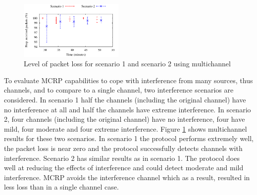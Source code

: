 \begin{figure}
\centering
\includegraphics[width=0.45\textwidth]{figures/multi_channel.pdf}
\caption{Level of packet loss for scenario 1 and scenario 2 using multichannel}
\label{fig:multi_interference}
\end{figure}

To evaluate MCRP capabilities to cope with interference from many sources, thus channels, and to compare to a single channel, two interference scenarios are considered.
In scenario 1 half the channels (including the original channel) have no
interference at all and half the channels have extreme interference.
In scenario 2, four channels (including the original channel) have no
interference, four have mild, four moderate and four extreme interference.
Figure \ref{fig:multi_interference} shows multichannel results for these
two scenarios. In scenario 1 the protocol performs extremely well, the packet loss is near zero and the protocol successfully detects channels with interference.
Scenario 2 has similar results as in scenario 1. The protocol does well at reducing the effects of interference and could detect moderate and mild interference.
MCRP avoids the interference channel which as a result, resulted in less loss than in a single channel case. 

